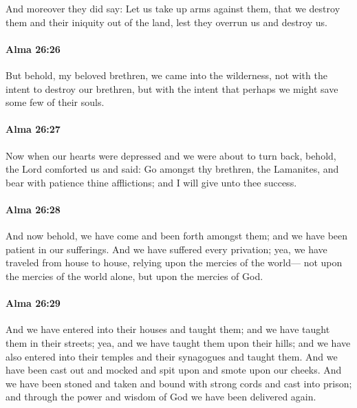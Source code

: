 			And moreover they did say:
			Let us take up arms against them,
			that we destroy them and their iniquity out of the land,
			lest they overrun us and destroy us.

		\paragraph{Alma 26:26} %
			\label{ALMA-26-26}

			But behold, my beloved brethren, we came into the wilderness,
			not with the intent to destroy our brethren,
			but with the intent that perhaps we might save some few of their souls.

		\paragraph{Alma 26:27} %
			\label{ALMA-26-27}

			Now when our hearts were depressed and we were about to turn back,
			behold, the Lord comforted us and said:
			Go amongst thy brethren, the Lamanites,
			and bear with patience thine afflictions;
			and I will give unto thee success.

		\paragraph{Alma 26:28} %
			\label{ALMA-26-28}

			And now behold, we have come and been forth amongst them;
			and we have been patient in our sufferings.
			And we have suffered every privation;
			yea, we have traveled from house to house,
			relying upon the mercies of the world---
			not upon the mercies of the world alone,
			but upon the mercies of God.

		\paragraph{Alma 26:29} %
			\label{ALMA-26-29}

			And we have entered into their houses and taught them;
			and we have taught them in their streets;
			yea, and we have taught them upon their hills;
			and we have also entered into their temples and their synagogues and taught them.
			And we have been cast out and mocked and spit upon and smote upon our cheeks.
			And we have been stoned
			and taken and bound with strong cords and cast into prison;
			and through the power and wisdom of God we have been delivered again.


